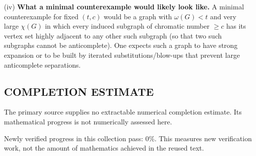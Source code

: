 (iv) \textbf{What a minimal counterexample would likely look like.}
A minimal counterexample for fixed $(t,c)$ would be a graph with $\omega(G)<t$ and very large $\chi(G)$ in which every induced subgraph of chromatic number $\ge c$ has its vertex set highly adjacent to any other such subgraph (so that two such subgraphs cannot be anticomplete). One expects such a graph to have strong expansion or to be built by iterated substitutions/blow-ups that prevent large anticomplete separations.



\subsection*{COMPLETION ESTIMATE}
The primary source supplies no extractable numerical completion estimate. Its mathematical progress is not numerically assessed here.

Newly verified progress in this collection pass: $0\%$. This measures new verification work, not the amount of mathematics achieved in the reused text.
